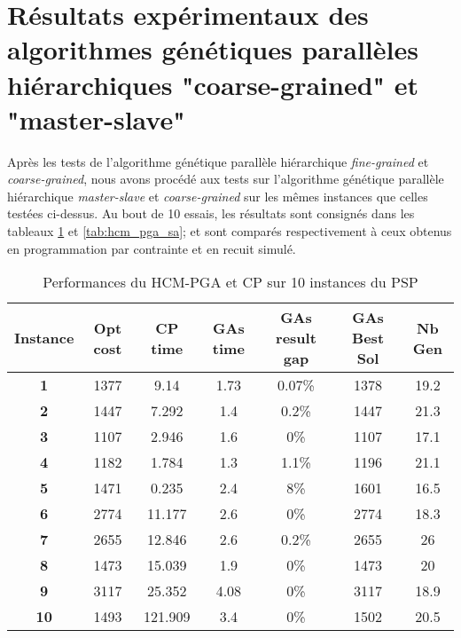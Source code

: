 		\section{Résultats expérimentaux des algorithmes génétiques parallèles hiérarchiques "coarse-grained" et "master-slave"}
		
		Après les tests de l'algorithme génétique parallèle hiérarchique \emph{fine-grained} et \emph{coarse-grained}, nous avons procédé aux tests sur l'algorithme génétique parallèle hiérarchique \emph{master-slave} et \emph{coarse-grained} sur les mêmes instances que celles testées ci-dessus. Au bout de 10 essais, les résultats sont consignés dans les tableaux \ref{tab:hcm_pga_cp}  et \ref{tab:hcm_pga_sa}; et sont comparés respectivement à ceux obtenus en programmation par contrainte et en recuit simulé.
		
		\begin{table}[h]
		\centering
		\begin{tabular}{|c|c|c|c|c|c|c|}
			\hline
			\textbf{Instance} & \textbf{Opt cost} & \textbf{CP time} & \textbf{GAs time} & \textbf{GAs result gap} & \textbf{GAs Best Sol} & \textbf{Nb Gen}\\
			\hline
			\textbf{1} & 1377 & 9.14 & 1.73 & 0.07\% & 1378 & 19.2 \\
			\textbf{2} & 1447 & 7.292 & 1.4 & 0.2\% & 1447 & 21.3\\
			\textbf{3} & 1107 & 2.946 & 1.6 & 0\% & 1107 & 17.1\\
			\textbf{4} & 1182 & 1.784 & 1.3 & 1.1\% & 1196 & 21.1\\
			\textbf{5} & 1471 & 0.235 & 2.4 & 8\% & 1601 & 16.5\\
			\textbf{6} & 2774 & 11.177 & 2.6 & 0\% & 2774 & 18.3\\
			\textbf{7} & 2655 & 12.846 & 2.6 & 0.2\% & 2655 & 26\\
			\textbf{8} & 1473 & 15.039 & 1.9 & 0\% & 1473 & 20\\
			\textbf{9} & 3117 & 25.352 & 4.08 & 0\% & 3117 & 18.9\\
			\textbf{10} & 1493 & 121.909 & 3.4 & 0\% & 1502 & 20.5\\
			\hline
		\end{tabular}	
		\caption{Performances du HCM-PGA et CP sur 10 instances du PSP}	
		\label{tab:hcm_pga_cp}	
	\end{table}	
	
